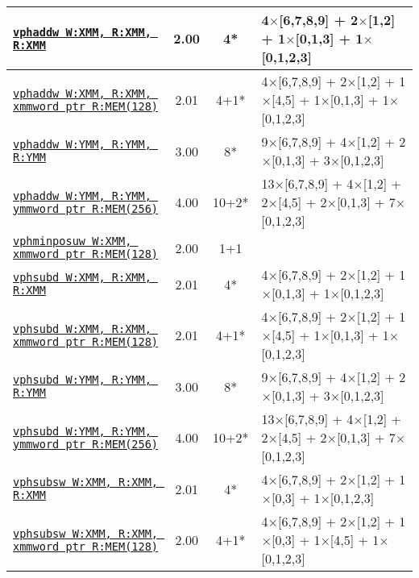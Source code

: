 \documentclass[a4paper,english,fontsize=9]{scrartcl}
\begin{document}
\begin{longtable}{p{}ccL{.25\textwidth}}
  \midrule
  \texttt{\href{https://felixcloutier.com/x86/PHADDW:PHADDD.html}{vphaddw W:XMM, R:XMM, R:XMM}} & 2.00 & 4* & 4\(\times\)[6,7,8,9] + 2\(\times\)[1,2] + 1\(\times\)[0,1,3] + 1\(\times\)[0,1,2,3] \\
  \midrule
  \texttt{\href{https://felixcloutier.com/x86/PHADDW:PHADDD.html}{vphaddw W:XMM, R:XMM, xmmword ptr R:MEM(128)}} & 2.01 & 4+1* & 4\(\times\)[6,7,8,9] + 2\(\times\)[1,2] + 1\(\times\)[4,5] + 1\(\times\)[0,1,3] + 1\(\times\)[0,1,2,3] \\
  \midrule
  \texttt{\href{https://felixcloutier.com/x86/PHADDW:PHADDD.html}{vphaddw W:YMM, R:YMM, R:YMM}} & 3.00 & 8* & 9\(\times\)[6,7,8,9] + 4\(\times\)[1,2] + 2\(\times\)[0,1,3] + 3\(\times\)[0,1,2,3] \\
  \midrule
  \texttt{\href{https://felixcloutier.com/x86/PHADDW:PHADDD.html}{vphaddw W:YMM, R:YMM, ymmword ptr R:MEM(256)}} & 4.00 & 10+2* & 13\(\times\)[6,7,8,9] + 4\(\times\)[1,2] + 2\(\times\)[4,5] + 2\(\times\)[0,1,3] + 7\(\times\)[0,1,2,3] \\
  \midrule
  \texttt{\href{https://felixcloutier.com/x86/PHMINPOSUW.html}{vphminposuw W:XMM, xmmword ptr R:MEM(128)}} & 2.00 & 1+1 &  \\
  \midrule
  \texttt{\href{https://felixcloutier.com/x86/PHSUBW:PHSUBD.html}{vphsubd W:XMM, R:XMM, R:XMM}} & 2.01 & 4* & 4\(\times\)[6,7,8,9] + 2\(\times\)[1,2] + 1\(\times\)[0,1,3] + 1\(\times\)[0,1,2,3] \\
  \midrule
  \texttt{\href{https://felixcloutier.com/x86/PHSUBW:PHSUBD.html}{vphsubd W:XMM, R:XMM, xmmword ptr R:MEM(128)}} & 2.01 & 4+1* & 4\(\times\)[6,7,8,9] + 2\(\times\)[1,2] + 1\(\times\)[4,5] + 1\(\times\)[0,1,3] + 1\(\times\)[0,1,2,3] \\
  \midrule
  \texttt{\href{https://felixcloutier.com/x86/PHSUBW:PHSUBD.html}{vphsubd W:YMM, R:YMM, R:YMM}} & 3.00 & 8* & 9\(\times\)[6,7,8,9] + 4\(\times\)[1,2] + 2\(\times\)[0,1,3] + 3\(\times\)[0,1,2,3] \\
  \midrule
  \texttt{\href{https://felixcloutier.com/x86/PHSUBW:PHSUBD.html}{vphsubd W:YMM, R:YMM, ymmword ptr R:MEM(256)}} & 4.00 & 10+2* & 13\(\times\)[6,7,8,9] + 4\(\times\)[1,2] + 2\(\times\)[4,5] + 2\(\times\)[0,1,3] + 7\(\times\)[0,1,2,3] \\
  \midrule
  \texttt{\href{https://felixcloutier.com/x86/PHSUBSW.html}{vphsubsw W:XMM, R:XMM, R:XMM}} & 2.01 & 4* & 4\(\times\)[6,7,8,9] + 2\(\times\)[1,2] + 1\(\times\)[0,3] + 1\(\times\)[0,1,2,3] \\
  \midrule
  \texttt{\href{https://felixcloutier.com/x86/PHSUBSW.html}{vphsubsw W:XMM, R:XMM, xmmword ptr R:MEM(128)}} & 2.00 & 4+1* & 4\(\times\)[6,7,8,9] + 2\(\times\)[1,2] + 1\(\times\)[0,3] + 1\(\times\)[4,5] + 1\(\times\)[0,1,2,3] \\

\end{longtable}
\end{document}
